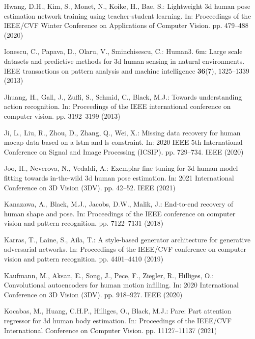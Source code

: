 \documentclass[runningheads]{llncs}
\begin{document}
\begin{thebibliography}{10}
Hwang, D.H., Kim, S., Monet, N., Koike, H., Bae, S.: Lightweight 3d human pose
  estimation network training using teacher-student learning. In: Proceedings
  of the IEEE/CVF Winter Conference on Applications of Computer Vision. pp.
  479--488 (2020)

Ionescu, C., Papava, D., Olaru, V., Sminchisescu, C.: Human3. 6m: Large scale
  datasets and predictive methods for 3d human sensing in natural environments.
  IEEE transactions on pattern analysis and machine intelligence
  \textbf{36}(7),  1325--1339 (2013)

Jhuang, H., Gall, J., Zuffi, S., Schmid, C., Black, M.J.: Towards understanding
  action recognition. In: Proceedings of the IEEE international conference on
  computer vision. pp. 3192--3199 (2013)

Ji, L., Liu, R., Zhou, D., Zhang, Q., Wei, X.: Missing data recovery for human
  mocap data based on a-lstm and ls constraint. In: 2020 IEEE 5th International
  Conference on Signal and Image Processing (ICSIP). pp. 729--734. IEEE (2020)

Joo, H., Neverova, N., Vedaldi, A.: Exemplar fine-tuning for 3d human model
  fitting towards in-the-wild 3d human pose estimation. In: 2021 International
  Conference on 3D Vision (3DV). pp. 42--52. IEEE (2021)

Kanazawa, A., Black, M.J., Jacobs, D.W., Malik, J.: End-to-end recovery of
  human shape and pose. In: Proceedings of the IEEE conference on computer
  vision and pattern recognition. pp. 7122--7131 (2018)

Karras, T., Laine, S., Aila, T.: A style-based generator architecture for
  generative adversarial networks. In: Proceedings of the IEEE/CVF conference
  on computer vision and pattern recognition. pp. 4401--4410 (2019)

Kaufmann, M., Aksan, E., Song, J., Pece, F., Ziegler, R., Hilliges, O.:
  Convolutional autoencoders for human motion infilling. In: 2020 International
  Conference on 3D Vision (3DV). pp. 918--927. IEEE (2020)

Kocabas, M., Huang, C.H.P., Hilliges, O., Black, M.J.: Pare: Part attention
  regressor for 3d human body estimation. In: Proceedings of the IEEE/CVF
  International Conference on Computer Vision. pp. 11127--11137 (2021)


\end{thebibliography}
\end{document}
